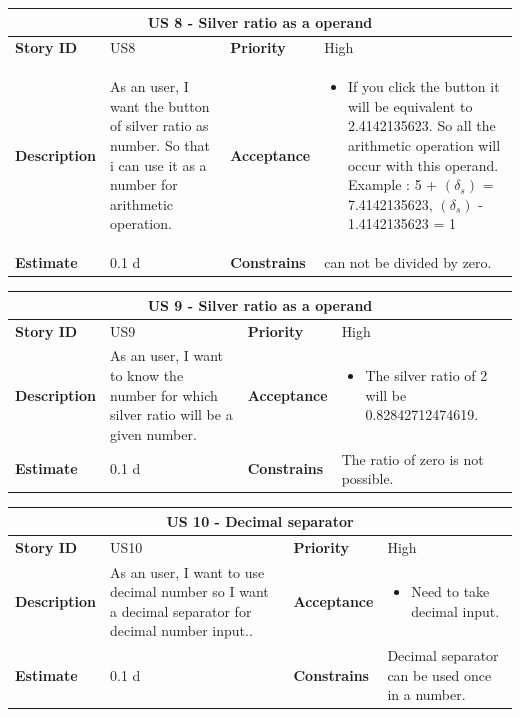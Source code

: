 \documentclass{article}
\begin{document}
\begin{tabular}{ |p{2cm}|p{5cm}|p{2cm}|p{4cm}| }
 \hline
 \multicolumn{4}{|c|}{US 8 - Silver ratio as a operand} \\
 \hline
 \textbf {Story ID}& US8 &  \textbf{Priority} & High \\
 \hline
  \textbf{Description}   & As an user, I want the button of silver ratio as number. So that i can use it as a number for arithmetic operation. &    \textbf{Acceptance}& 
\begin{itemize}
\item  If you click the button it will be equivalent to 2.4142135623. So all the arithmetic operation will occur with this operand. Example : 5 + $(\delta_s)$ = 7.4142135623, $(\delta_s)$ - 1.4142135623 = 1
\end{itemize}
  \\
 \hline
 \textbf{Estimate} & 0.1 d &  \textbf{Constrains}&  can not be divided by zero.  \\
 \hline
\end{tabular}

\begin{tabular}{ |p{2cm}|p{5cm}|p{2cm}|p{4cm}| }
 \hline
 \multicolumn{4}{|c|}{US 9 - Silver ratio as a operand} \\
 \hline
 \textbf {Story ID}& US9 &  \textbf{Priority} & High \\
 \hline
  \textbf{Description}   & As an user, I want to know the number for which silver ratio will be a given number. &    \textbf{Acceptance}& 
\begin{itemize}
\item  The silver ratio of 2 will be 0.82842712474619.
\end{itemize}
  \\
 \hline
 \textbf{Estimate} & 0.1 d &  \textbf{Constrains}&  The ratio of zero is not possible.  \\
 \hline
\end{tabular}

\begin{tabular}{ |p{2cm}|p{5cm}|p{2cm}|p{4cm}| }
 \hline
 \multicolumn{4}{|c|}{US 10 -  Decimal separator} \\
 \hline
 \textbf {Story ID}& US10 &  \textbf{Priority} & High \\
 \hline
  \textbf{Description}   & As an user, I want to use decimal number so I want a decimal separator for decimal number input.. &    \textbf{Acceptance}& 
\begin{itemize}
\item  Need to take decimal input.
\end{itemize}
  \\
 \hline
 \textbf{Estimate} & 0.1 d &  \textbf{Constrains}&  Decimal separator can be used once in a number.  \\
 \hline
\end{tabular}
\end{document}
